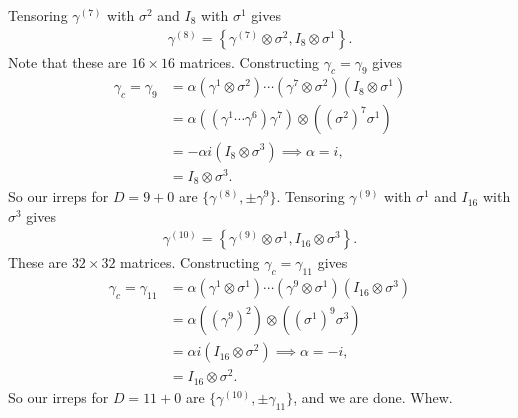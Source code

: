 \documentclass[11pt]{article}
\begin{document}
\begin{eexample}
    Tensoring $\gamma^{(7)}$ with $\sigma^2$ and $I_8$ with $\sigma^1$
    gives
    \begin{align*}
        \gamma^{(8)} = \left\{ \gamma^{(7)} \otimes \sigma^2, I_8 \otimes \sigma^1 \right\}.
    \end{align*}
    Note that these are $16 \times 16$ matrices. Constructing $\gamma_c = \gamma_9$ gives
    \begin{align*}
        \gamma_c = \gamma_9 & = \alpha (\gamma^1 \otimes \sigma^2)\cdots(\gamma^7 \otimes \sigma^2)(I_8 \otimes \sigma^1)\\
        & = \alpha ((\gamma^1 \cdots \gamma^6) \gamma^7 ) \otimes ((\sigma^2)^7 \sigma^1)\\
        & = - \alpha i (I_8 \otimes \sigma^3) \implies \alpha = i,\\
        & = \boxed{I_8 \otimes \sigma^3.}
    \end{align*}
    So our irreps for $D = 9 + 0$ are $\{ \gamma^{(8)}, \pm \gamma^9 \}$.
    Tensoring $\gamma^{(9)}$ with $\sigma^1$ and $I_{16}$ with $\sigma^3$
    gives
    \begin{align*}
        \gamma^{(10)} =  \left\{ \gamma^{(9)} \otimes \sigma^1, I_{16} \otimes \sigma^3 \right\}.
    \end{align*}
    These are $32 \times 32$ matrices. Constructing $\gamma_c = \gamma_{11}$
    gives
    \begin{align*}
        \gamma_c = \gamma_{11} & = \alpha (\gamma^1 \otimes \sigma^1)\cdots(\gamma^9 \otimes \sigma^1)(I_{16} \otimes \sigma^3)\\
        & = \alpha ((\gamma^9)^2) \otimes ((\sigma^1)^9 \sigma^3)\\
        & = \alpha i (I_{16} \otimes \sigma^2) \implies \alpha = -i,\\
        & = \boxed{I_{16} \otimes \sigma^2.}
    \end{align*}
    So our irreps for $D = 11 + 0$ are $\{ \gamma^{(10)}, \pm \gamma_{11} \}$,
    and we are done. Whew.
\end{eexample}
\end{document}
